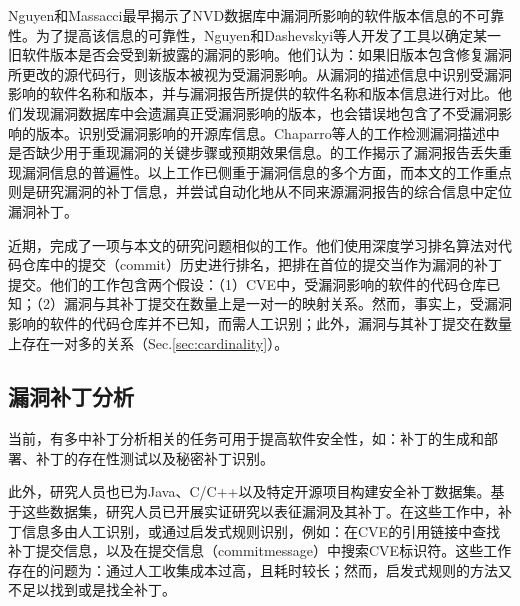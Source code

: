 Nguyen和Massacci\cite{nguyen2013reliability}最早揭示了NVD数据库中漏洞所影响的软件版本信息的不可靠性。为了提高该信息的可靠性，Nguyen\cite{nguyen2016automatic}和Dashevskyi等人\cite{dashevskyi2018screening}开发了工具以确定某一旧软件版本是否会受到新披露的漏洞的影响。他们认为：如果旧版本包含修复漏洞所更改的源代码行，则该版本被视为受漏洞影响。\cite{dong2019towards}从漏洞的描述信息中识别受漏洞影响的软件名称和版本，并与漏洞报告所提供的软件名称和版本信息进行对比。他们发现漏洞数据库中会遗漏真正受漏洞影响的版本，也会错误地包含了不受漏洞影响的版本。\cite{chen2020automated}识别受漏洞影响的开源库信息。Chaparro等人的工作\cite{chaparro2017detecting}检测漏洞描述中是否缺少用于重现漏洞的关键步骤或预期效果信息。的工作\cite{mu2018understanding}揭示了漏洞报告丢失重现漏洞信息的普遍性。以上工作已侧重于漏洞信息的多个方面，而本文的工作重点则是研究漏洞的补丁信息，并尝试自动化地从不同来源漏洞报告的综合信息中定位漏洞补丁。

近期，完成了一项与本文的研究问题相似的工作\cite{Tan2021locating}。他们使用深度学习排名算法对代码仓库中的提交（commit）历史进行排名，把排在首位的提交当作为漏洞的补丁提交。他们的工作包含两个假设：（1）CVE中，受漏洞影响的软件的代码仓库已知；（2）漏洞与其补丁提交在数量上是一对一的映射关系。然而，事实上，受漏洞影响的软件的代码仓库并不已知，而需人工识别；此外，漏洞与其补丁提交在数量上存在一对多的关系（Sec.\ref{sec:cardinality}）。


\subsection{漏洞补丁分析}
当前，有多中补丁分析相关的任务可用于提高软件安全性，如：补丁的生成和部署\cite{mulliner2013patchdroid,duan2019automating,xu2020automatic}、补丁的存在性测试\cite{zhang2018precise,jiang2020pdiff,dai2020bscout}以及秘密补丁识别\cite{xu2017spain,zhou2017automated,sabetta2018practical,chen2020machine}。

此外，研究人员也已为Java\cite{ponta2019manually}、C/C++\cite{fan2020ac}以及特定开源项目\cite{jimenez2018enabling}构建安全补丁数据集。基于这些数据集，研究人员已开展实证研究以表征漏洞及其补丁\cite{zaman2011security,li2017large,liu2020large,antal2020exploring}。在这些工作中，补丁信息多由人工识别\cite{xu2020automatic,jiang2020pdiff,dai2020bscout,xu2017spain,zhou2017automated,sabetta2018practical,chen2020machine,ponta2019manually,zaman2011security}，或通过启发式规则识别，例如：在CVE的引用链接中查找补丁提交信息\cite{duan2019automating,fan2020ac,jimenez2018enabling,li2017large,liu2020large}，以及在提交信息（commitmessage）中搜索CVE标识符\cite{fan2020ac,jimenez2018enabling,antaloring}。这些工作存在的问题为：通过人工收集成本过高，且耗时较长；然而，启发式规则的方法又不足以找到或是找全补丁。


